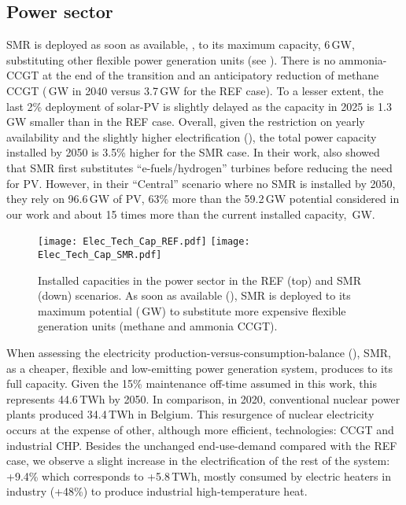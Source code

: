 \subsection{Power sector}
\label{subsec:atom_mol:results_deter_power_sector}
\gls{SMR} is deployed as soon as available, , to its maximum capacity, 6\,GW, substituting other flexible power generation units (see ). There is no ammonia-\gls{CCGT} at the end of the transition and an anticipatory reduction of methane \gls{CCGT} (\,GW in 2040 versus 3.7\,GW for the REF case). To a lesser extent, the last 2\% deployment of solar-\gls{PV} is slightly delayed as the capacity in 2025 is 1.3\,GW smaller than in the REF case. Overall, given the restriction on yearly availability and the slightly higher electrification (), the total power capacity installed by 2050 is 3.5\% higher for the SMR case. In their work, \citet{PATHS2050} also showed that \gls{SMR} first substitutes ``e-fuels/hydrogen'' turbines before reducing the need for \gls{PV}. However, in their ``Central'' scenario where no \gls{SMR} is installed by 2050, they rely on 96.6\,GW of \gls{PV}, 63\% more than the 59.2\,GW potential considered in our work and about 15 times more than the current installed capacity, \,GW. \\

\begin{figure}[htbp!]
\centering
\texttt{[image: Elec\_Tech\_Cap\_REF.pdf]}
\texttt{[image: Elec\_Tech\_Cap\_SMR.pdf]}
\caption{Installed capacities in the power sector in the REF (top) and SMR (down) scenarios. As soon as available (), \acrfull{SMR} is deployed to its maximum potential (\,GW) to substitute more expensive flexible generation units (\ie methane and ammonia \gls{CCGT}).}
\label{fig:results_deter_tech_cap_elec}
\end{figure}

\newpage
When assessing the electricity production-versus-consumption-balance (), \gls{SMR}, as a cheaper, flexible and low-emitting power generation system, produces to its full capacity. Given the 15\% maintenance off-time assumed in this work, this represents 44.6\,TWh by 2050. In comparison, in 2020, conventional nuclear power plants produced 34.4\,TWh in Belgium. This resurgence of nuclear electricity occurs at the expense of other, although more efficient, technologies: \gls{CCGT} and industrial \gls{CHP}. Besides the unchanged end-use-demand compared with the REF case, we observe a slight increase in the electrification of the rest of the system: +9.4\% which corresponds to +5.8\,TWh, mostly consumed by electric heaters in industry (+48\%) to produce industrial high-temperature heat.

